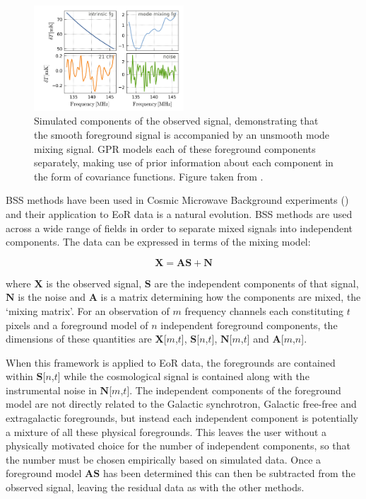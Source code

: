 \begin{figure}
\begin{center}
    \includegraphics[width=0.5\textwidth]{Images/mertens_components.png}
\end{center}
    \caption{Simulated components of the observed signal, demonstrating that the smooth foreground signal is accompanied by an unsmooth mode mixing signal. GPR models each of these foreground components separately, making use of prior information about each component in the form of covariance functions. Figure taken from \citet{Mertens2018MNRAS.478.3640M}.}
    \label{fig:mertens_comp}
\end{figure}

 BSS methods have been used in Cosmic Microwave Background experiments (\citet{PlanckI2018arXiv180706205P,PlanckIV2018}) and their application to EoR data is a natural evolution. BSS methods are used across a wide range of fields in order to separate mixed signals into independent components. The data can be expressed in terms of the mixing model:

\begin{equation}
\mathbf{X} = \mathbf{A}\mathbf{S} + \mathbf{N}
\end{equation}

\noindent where $\mathbf{X}$ is the observed signal, $\mathbf{S}$ are the independent components of that signal, $\mathbf{N}$ is the noise and $\mathbf{A}$ is a matrix determining how the components are mixed, the `mixing matrix'. For an observation of $m$ frequency channels each constituting $t$ pixels and a foreground model of $n$ independent foreground components, the dimensions of these quantities are $\mathbf{X}$[$m$,$t$], $\mathbf{S}$[$n$,$t$], $\mathbf{N}$[$m$,$t$] and $\mathbf{A}$[$m$,$n$].

When this framework is applied to EoR data, the foregrounds are contained within $\mathbf{S}$[$n$,$t$] while the cosmological signal is contained along with the instrumental noise in $\mathbf{N}$[$m$,$t$]. The independent components of the foreground model are not directly related to the Galactic synchrotron, Galactic free-free and extragalactic foregrounds, but instead each independent component is potentially a mixture of all these physical foregrounds. This leaves the user without a physically motivated choice for the number of independent components, so that the number must be chosen empirically based on simulated data. Once a foreground model $\mathbf{A}\mathbf{S}$ has been determined this can then be subtracted from the observed signal, leaving the residual data as with the other methods.

